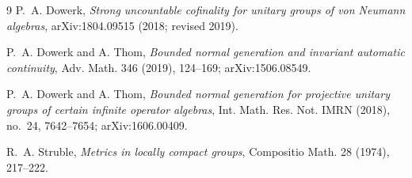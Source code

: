 \documentclass[11pt]{article}
\begin{document}
\begin{thebibliography}{9}
P.~A. Dowerk,
\emph{Strong uncountable cofinality for unitary groups of von Neumann
algebras}, arXiv:1804.09515 (2018; revised 2019).

P.~A. Dowerk and A. Thom,
\emph{Bounded normal generation and invariant automatic continuity},
Adv. Math. 346 (2019), 124--169; arXiv:1506.08549.

P.~A. Dowerk and A. Thom,
\emph{Bounded normal generation for projective unitary groups of certain
infinite operator algebras}, Int. Math. Res. Not. IMRN (2018), no.~24,
7642--7654; arXiv:1606.00409.

R.~A. Struble,
\emph{Metrics in locally compact groups},
Compositio Math. 28 (1974), 217--222.
\end{thebibliography}
\end{document}

